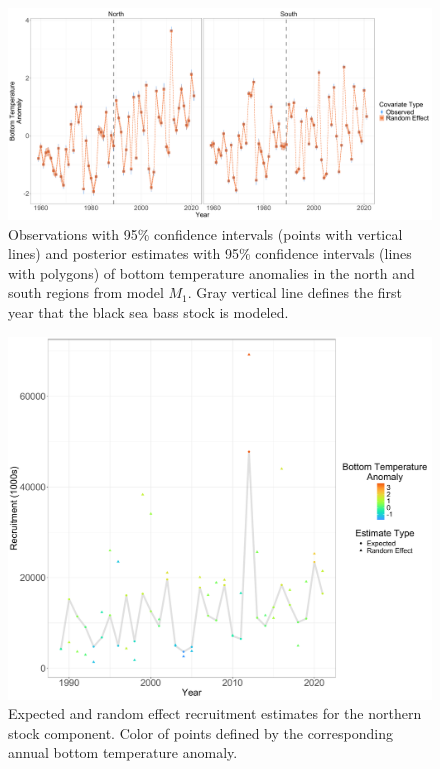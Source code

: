 \documentclass[
]{article}
\begin{document}
\begin{landscape}

\begin{figure}

{\centering \includegraphics[width=1\linewidth]{BTA_full_fig} 

}

\caption{Observations with 95\% confidence intervals (points with vertical lines) and posterior estimates with 95\% confidence intervals (lines with polygons) of bottom temperature anomalies in the north and south regions from model $M_1$. Gray vertical line defines the first year that the black sea bass stock is modeled.}\label{fig:bottom-temperature}
\end{figure}

\end{landscape}
\pagebreak

\begin{figure}

{\centering \includegraphics[width=1\linewidth]{best_R_Ecov} 

}

\caption{Expected and random effect recruitment estimates for the northern stock component. Color of points defined by the corresponding annual bottom temperature anomaly.}\label{fig:BT-Ecov-R}
\end{figure}
\pagebreak
\end{document}
